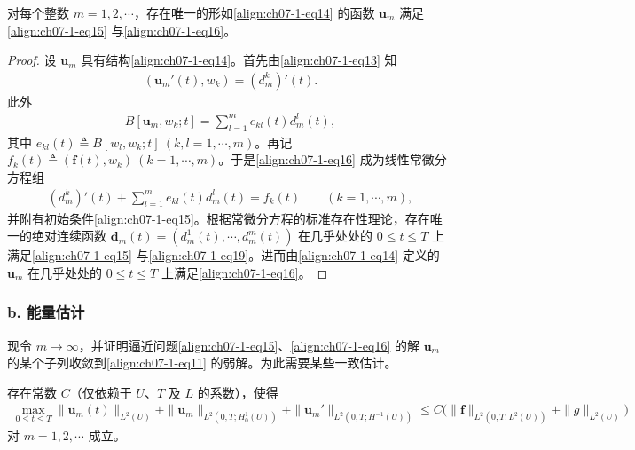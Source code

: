 \documentclass[../../main.tex]{subfiles}
\begin{document}
\begin{theorem}[近似解的构造。]\label{theorem:ch07-1-近似解的构造}对每个整数 $m=1,2,\cdots$，存在唯一的形如\eqref{align:ch07-1-eq14} 的函数 $\mathbf{u}_m$ 满足\eqref{align:ch07-1-eq15} 与\eqref{align:ch07-1-eq16}。
\end{theorem}

\begin{proof}
设 $\mathbf{u}_m$ 具有结构\eqref{align:ch07-1-eq14}。首先由\eqref{align:ch07-1-eq13} 知
\begin{align}
(\mathbf{u}_m'(t),w_k) = (d_m^k)'(t).\label{align:ch07-1-eq17}
\end{align}
此外
\begin{align}
B[\mathbf{u}_m,w_k;t] = \sum_{l=1}^m e_{kl}(t)d_m^l(t),\label{align:ch07-1-eq18}
\end{align}
其中 $e_{kl}(t)\triangleq B[w_l,w_k;t]\ (k,l=1,\cdots,m)$。再记 $f_k(t)\triangleq(\mathbf{f}(t),w_k)\ (k=1,\cdots,m)$。于是\eqref{align:ch07-1-eq16} 成为线性常微分方程组
\begin{align}
(d_m^k)'(t) + \sum_{l=1}^m e_{kl}(t)d_m^l(t) = f_k(t)\qquad (k=1,\cdots,m),\label{align:ch07-1-eq19}
\end{align}
并附有初始条件\eqref{align:ch07-1-eq15}。根据常微分方程的标准存在性理论，存在唯一的绝对连续函数 $\mathbf{d}_m(t)=(d_m^1(t),\cdots,d_m^m(t))$ 在几乎处处的 $0\leqslant t\leqslant T$ 上满足\eqref{align:ch07-1-eq15} 与\eqref{align:ch07-1-eq19}。进而由\eqref{align:ch07-1-eq14} 定义的 $\mathbf{u}_m$ 在几乎处处的 $0\leqslant t\leqslant T$ 上满足\eqref{align:ch07-1-eq16}。
\end{proof}

\subsubsection*{b. 能量估计}

现令 $m\to\infty$，并证明逼近问题\eqref{align:ch07-1-eq15}、\eqref{align:ch07-1-eq16} 的解 $\mathbf{u}_m$ 的某个子列收敛到\eqref{align:ch07-1-eq11} 的弱解。为此需要某些一致估计。

\begin{theorem}[能量估计。]\label{theorem:ch07-1-能量估计}存在常数 $C$（仅依赖于 $U$、$T$ 及 $L$ 的系数），使得
\begin{align}
\max_{0\leqslant t\leqslant T}\|\mathbf{u}_m(t)\|_{L^2(U)} + \|\mathbf{u}_m\|_{L^2(0,T;H^1_0(U))} + \|\mathbf{u}_m'\|_{L^2(0,T;H^{-1}(U))}
\leqslant C\bigl(\|\mathbf{f}\|_{L^2(0,T;L^2(U))}+\|g\|_{L^2(U)}\bigr)\label{align:ch07-1-eq20}
\end{align}
对 $m=1,2,\cdots$ 成立。
\end{theorem}
\end{document}
